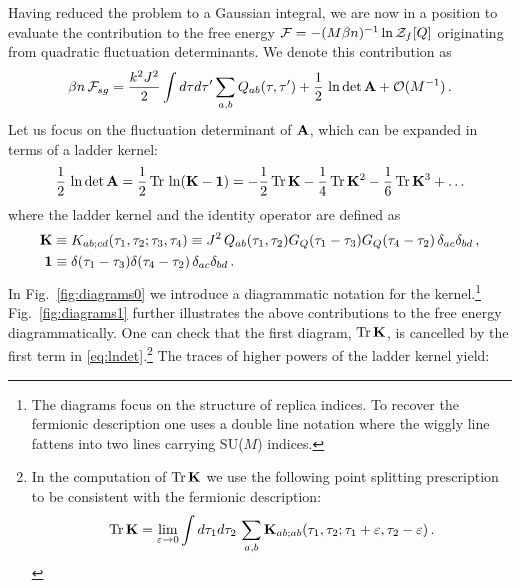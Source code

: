 \documentclass[aps,prx,preprint,onecolumn,citeautoscript,superscriptaddress,nofootinbib,
eqsecnum]{revtex4}
\begin{document}
{Having reduced the problem to a Gaussian integral, we are now in a position to evaluate the contribution to the free energy $ {\cal F} = - (M\beta n)^{-1} \ln  {\cal Z}_f[Q]$ originating from quadratic fluctuation determinants. We denote this contribution as
\begin{equation}
\label{eq:lndet}
\beta n \, {\cal F}_{sg}  =  \frac{k^2J^2}{2} \int d\tau d\tau' \sum_{a,b} Q_{ab}(\tau,\tau') + \frac{1}{2} \,\ln \det {\bf A} 
+ {\cal O}(M^{-1})\,.
\end{equation}
Let us focus on the fluctuation determinant of ${\bf A}$, which can be expanded in terms of a ladder kernel:
\begin{equation}
\frac{1}{2}\,\ln \det {\bf A} 
 =   \frac{1}{2}\,  \text{Tr} \,\ln({\bf K}-{\bf 1}) 
 =  - \frac{1}{2} \, \text{Tr} \, {\bf K} - \frac{1}{4} \, \text{Tr}\, {\bf K}^2 - \frac{1}{6} \, \text{Tr}\, {\bf K}^3 + \ldots
\end{equation}
where the ladder kernel and the identity operator are defined as
\begin{equation}
\begin{split}
 {\bf K} &\equiv K_{ab;cd}(\tau_1,\tau_2;\tau_3,\tau_4) \equiv 
J^2\, Q_{ab}(\tau_1,\tau_2) G_Q(\tau_1-\tau_3)G_Q(\tau_4-\tau_2)\,\delta_{ac}\delta_{bd}\,, \\
{\bf 1} &\equiv \delta(\tau_1-\tau_3)\delta(\tau_4-\tau_2) \, \delta_{ac} \delta_{bd} \,.
\end{split}
\end{equation}
In Fig.~\ref{fig:diagrams0} we introduce a diagrammatic notation for the kernel.\footnote{ The diagrams focus on the structure of replica indices. To recover the fermionic description one uses a double line notation where the wiggly line fattens into two lines carrying SU($M$) indices.}
Fig.~\ref{fig:diagrams1} further illustrates the above contributions to the free energy diagrammatically. One can check that the first diagram, $\text{Tr}\, {\bf K}$, is cancelled by the first term in \eqref{eq:lndet}.\footnote{ In the computation of $\text{Tr}\, {\bf K}$ we use the following point splitting prescription to be consistent with the fermionic description: 
\begin{equation}
    \text{Tr}\,{\bf K} = \lim_{\varepsilon \rightarrow 0 } \int d\tau_1 d\tau_2  \, \sum_{a,b} {\bf K}_{ab;ab}(\tau_1,\tau_2;\tau_1+\varepsilon,\tau_2-\varepsilon)\,.
\end{equation}
}
The traces of higher powers of the ladder kernel yield:
\begin{equation}

\end{equation}}
\end{document}
